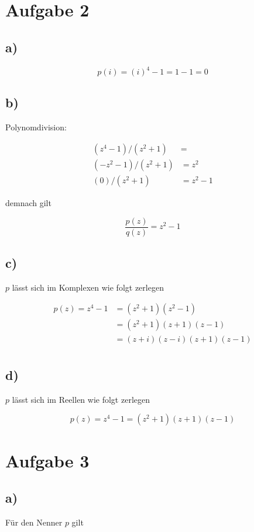 \documentclass[a4paper, 11pt]{article}
\begin{document}
\section{Aufgabe 2}
\label{sec:org46c9491}
\subsection{a)}
\label{sec:org0899e82}
$$ p(i) = (i)^4 - 1 = 1 - 1 = 0 $$

\subsection{b)}
\label{sec:orgb030cde}
Polynomdivision:

\begin{align*}
    (z^4 - 1) / (z^2 + 1) &= \\
    (-z^2 - 1) / (z^2 + 1) &= z^2 \\
    (0) / (z^2 + 1) &= z^2 - 1
\end{align*}

demnach gilt

$$ \frac{p(z)}{q(z)} = z^2 - 1 $$

\subsection{c)}
\label{sec:org9411866}
\(p\) lässt sich im Komplexen wie folgt zerlegen

\begin{align*}
    p(z) = z^4 - 1 &= (z^2 + 1)(z^2 - 1) \\
    &= (z^2 + 1)(z + 1)(z - 1) \\
    &= (z + i)(z - i)(z + 1)(z - 1) \\
\end{align*}

\subsection{d)}
\label{sec:org95b1a46}
\(p\) lässt sich im Reellen wie folgt zerlegen

$$ p(z) = z^4 - 1 = (z^2 + 1)(z + 1)(z - 1) $$

\section{Aufgabe 3}
\label{sec:org9b2e33c}
\subsection{a)}
\label{sec:orgfea44ae}
Für den Nenner \(p\) gilt
\end{document}
